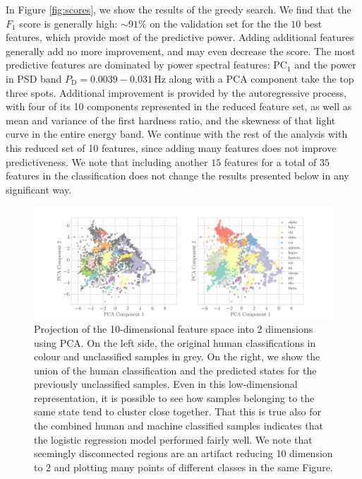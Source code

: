 \documentclass[fleqn,usenatbib]{mnras}
\begin{document}
In Figure \ref{fig:scores}, we show the results of the greedy search. We find that the $F_1$ score is generally high: $\sim\!\! 91\%$ on the validation set for the the $10$ best features, which provide most of the predictive power. Adding additional features generally add no more improvement, and may even decrease the score. The most predictive features are dominated by power spectral features: $\mathrm{PC}_1$ and the power in PSD band  $P_\mathrm{D} = 0.0039-0.031 \,\mathrm{Hz}$ along with a PCA component take the top three spots. Additional improvement is provided by the autoregressive process, with four of its 10 components represented in the reduced feature set, as well as mean and variance of the first hardness ratio, and the skewness of that light curve in the entire energy band. We continue with the rest of the analysis with this reduced set of 10 features, since adding many features does not improve predictiveness. We note that including another $15$ features for a total of $35$ features in the classification does not change the results presented below in any significant way.


\begin{figure}
\begin{center}
\includegraphics[width=\textwidth]{grs1915_supervised_pca_comparison.pdf}
\caption{Projection of the 10-dimensional feature space into 2 dimensions using PCA. On the left side, the original human classifications in colour and 
unclassified samples in grey. On the right, we show the union of the human classification and the predicted states for the previously unclassified samples. 
Even in this low-dimensional representation, it is possible to see how samples belonging to the same state tend to cluster close together. That this is true also 
for the combined human and machine classified samples indicates that the logistic regression model performed fairly well. We note that seemingly disconnected 
regions are an artifact reducing 10 dimension to 2 and plotting many points of different classes in the same Figure.} 
\label{fig:supervised_pca}
\end{center}
\end{figure}
\end{document}
